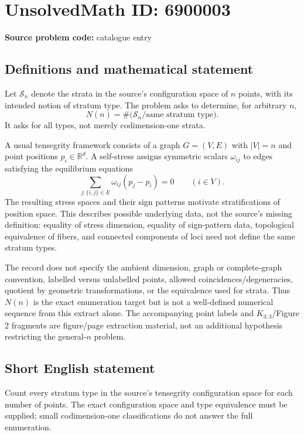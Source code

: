 \documentclass[11pt]{article}
\newcommand{\R}{\mathbb{R}}
\begin{document}
\section*{UnsolvedMath ID: 6900003}
\textbf{Source problem code:} catalogue entry
\subsection{Definitions and mathematical statement}
Let $\mathcal S_n$ denote the strata in the source's configuration space of $n$ points, with its intended notion of stratum type. The problem asks to determine, for arbitrary $n$,
\[
N(n)=\#\bigl(\mathcal S_n/\text{same stratum type}\bigr).
\]
It asks for all types, not merely codimension-one strata.

A usual tensegrity framework consists of a graph $G=(V,E)$ with $|V|=n$ and point positions $p_i\in\R^d$. A self-stress assigns symmetric scalars $\omega_{ij}$ to edges satisfying the equilibrium equations
\[
\sum_{j:\{i,j\}\in E}\omega_{ij}(p_j-p_i)=0\qquad(i\in V).
\]
The resulting stress spaces and their sign patterns motivate stratifications of position space. This describes possible underlying data, not the source's missing definition: equality of stress dimension, equality of sign-pattern data, topological equivalence of fibers, and connected components of loci need not define the same stratum types.

The record does not specify the ambient dimension, graph or complete-graph convention, labelled versus unlabelled points, allowed coincidences/degeneracies, quotient by geometric transformations, or the equivalence used for strata. Thus $N(n)$ is the exact enumeration target but is not a well-defined numerical sequence from this extract alone. The accompanying point labels and $K_{3;3}$/Figure 2 fragments are figure/page extraction material, not an additional hypothesis restricting the general-$n$ problem.
\subsection{Short English statement}
Count every stratum type in the source's tensegrity configuration space for each number of points. The exact configuration space and type equivalence must be supplied; small codimension-one classifications do not answer the full enumeration.
\end{document}
